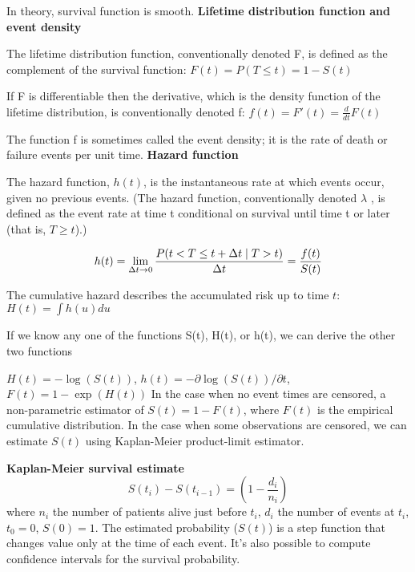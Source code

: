 \documentclass[12pt]{article}
\begin{document}
\item In theory, survival function is smooth.
\ule
\textbf{Lifetime distribution function and event density}
\ulb
\item The lifetime distribution function, conventionally denoted F, is defined as the complement of the survival function: $F(t) = P(T \leq t) = 1 - S(t)$
\item If F is differentiable then the derivative, which is the density function of the lifetime distribution, is conventionally denoted f: $f(t) = F'(t) = \frac{d}{dt}F(t)$
\item The function f is sometimes called the event density; it is the rate of death or failure events per unit time.
\ule
\textbf{Hazard function}
\ulb
\item The hazard function, $h(t)$, is the instantaneous rate at which events occur, given no previous events. (The hazard function, conventionally denoted $\lambda$ , is defined as the event rate at time t conditional on survival until time t or later (that is, $T \geq t$).)
\item $$h(t) = \lim_{\Delta t \to 0} \frac{P(t<T\leq t + \Delta t \mid T > t)}{\Delta t} = \frac{f(t)}{S(t)}$$
\item The cumulative hazard describes the accumulated risk up to time $t$: $H(t) = \int h(u)du$
\item If we know any one of the functions S(t), H(t), or h(t), we can derive the other two functions
\item $H(t) = -\log (S(t))$, $h(t) = - \partial\log (S(t)) / \partial t$, $ F(t) = 1 - \exp (H(t)) $
\ule
In the case when no event times are censored, a non-parametric estimator of $S(t) = 1 - F(t)$, where $F(t)$ is the empirical cumulative distribution. In the case when some observations are censored, we can estimate $S(t)$ using Kaplan-Meier product-limit estimator.
\par \textbf{Kaplan-Meier survival estimate}
$$ S(t_i) - S(t_{i-1}) = (1 - \frac{d_i}{n_i}) $$
where $n_i$ the number of patients alive just before $t_i$, $d_i$ the number of events at $t_i$, $t_0 = 0$, $S(0) = 1$. The estimated probability ($S(t)$) is a step function that changes value only at the time of each event. It’s also possible to compute confidence intervals for the survival probability.
\end{document}
